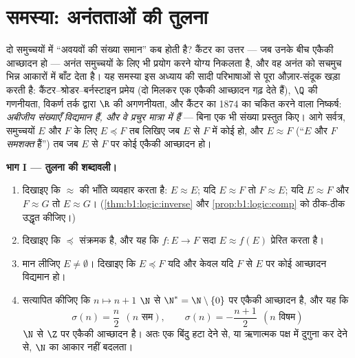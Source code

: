\section{समस्या: अनंतताओं की तुलना}

\begin{problem}\label{pb:b1:logic:1}
दो समुच्चयों में ``अवयवों की संख्या समान'' कब होती है? कैंटर का उत्तर --- जब
उनके बीच एकैकी आच्छादन हो --- अनंत समुच्चयों के लिए भी प्रयोग करने योग्य
निकलता है, और वह अनंत को सचमुच भिन्न आकारों में बाँट देता है। यह समस्या इस
अध्याय की सादी परिभाषाओं से पूरा औज़ार-संदूक खड़ा करती है:
कैंटर--श्रोडर--बर्नस्टाइन प्रमेय (दो   मिलकर एक एकैकी
आच्छादन गढ़ देते हैं), $\Q$ की गणनीयता, विकर्ण तर्क द्वारा $\R$ की अगणनीयता,
और कैंटर का 1874 का चकित करने वाला निष्कर्ष: \emph{अबीजीय संख्याएँ विद्यमान
हैं, और वे प्रचुर मात्रा में हैं} --- बिना एक भी संख्या प्रस्तुत किए।
 आगे सर्वत्र,
समुच्चयों $E$ और $F$ के लिए $E \preceq F$ तब लिखिए जब $E$ से $F$ में कोई
  हो, और $E \approx F$ (``$E$ और $F$ \emph{समशक्त} हैं'') तब
जब $E$ से $F$ पर कोई एकैकी आच्छादन हो।

\medskip \noindent\textbf{भाग I --- तुलना की शब्दावली।}
\begin{enumerate}
  \item दिखाइए कि $\approx$  की भाँति व्यवहार करता है: $E
  \approx E$; यदि $E \approx F$ तो $F \approx E$; यदि $E \approx F$ और $F
  \approx G$ तो $E \approx G$। (\cref{thm:b1:logic:inverse} और
  \cref{prop:b1:logic:comp} को ठीक-ठीक उद्धृत कीजिए।)
  \item दिखाइए कि $\preceq$ संक्रमक है, और यह कि   $f \colon
  E \to F$ सदा $E \approx f(E)$ प्रेरित करता है।
  \item मान लीजिए $E \neq \emptyset$। दिखाइए कि $E \preceq F$ यदि और केवल
  यदि $F$ से $E$ पर कोई आच्छादन विद्यमान हो।
  \item सत्यापित कीजिए कि $n \mapsto n + 1$ $\N$ से $\N^* = \N \setminus
  \{0\}$ पर एकैकी आच्छादन है, और यह कि
        \[
        \sigma(n) = \frac n2 \ \ (n \text{ सम}), \qquad
        \sigma(n) = -\frac{n+1}2 \ \ (n \text{ विषम})
        \]
        $\N$ से $\Z$ पर एकैकी आच्छादन है। अतः एक बिंदु हटा देने से, या
        ऋणात्मक पक्ष में दुगुना कर देने से, $\N$ का आकार नहीं बदलता।
\end{enumerate}


\end{problem}
